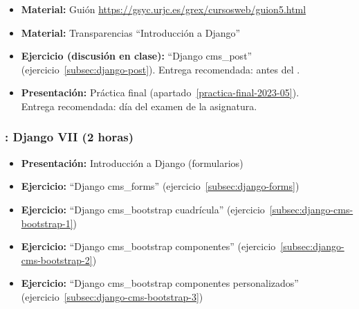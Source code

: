 \documentclass[a4paper,12pt]{article}
\begin{document}
\begin{itemize}

 \item \textbf{Material:} Guión \url{https://gsyc.urjc.es/grex/cursosweb/guion5.html}
 \item \textbf{Material:} Transparencias ``Introducción a Django''
 \item \textbf{Ejercicio (discusión en clase):} ``Django cms\_post'' (ejercicio~\ref{subsec:django-post}).
  Entrega recomendada: antes del \juevesM.
  \item \textbf{Presentación:} Práctica final (apartado~\ref{practica-final-2023-05}). \\
   Entrega recomendada: día del examen de la asignatura.
\end{itemize}

\subsubsection{\juevesM: Django VII (2 horas)}
\label{cal:juevesM}

\begin{itemize}
  \item \textbf{Presentación:} Introducción a Django (formularios)
  \item \textbf{Ejercicio:} ``Django cms\_forms'' (ejercicio~\ref{subsec:django-forms}) \\
  \item \textbf{Ejercicio:} ``Django cms\_bootstrap cuadrícula'' (ejercicio~\ref{subsec:django-cms-bootstrap-1})
  \item \textbf{Ejercicio:} ``Django cms\_bootstrap componentes'' (ejercicio~\ref{subsec:django-cms-bootstrap-2})
  \item \textbf{Ejercicio:} ``Django cms\_bootstrap componentes personalizados'' (ejercicio~\ref{subsec:django-cms-bootstrap-3})
  \end{itemize}
\end{document}

